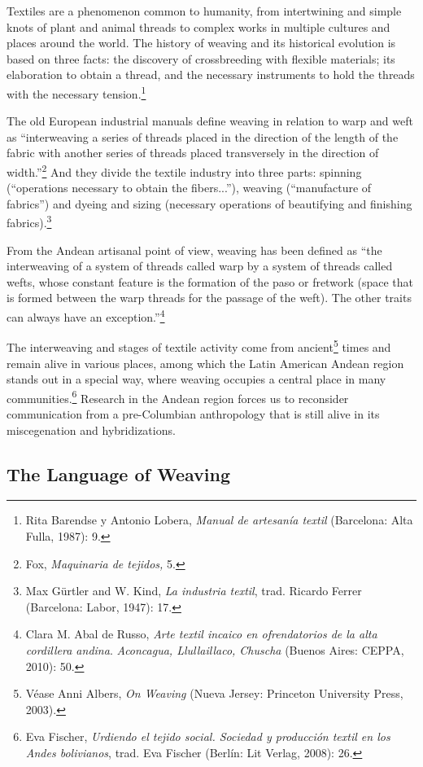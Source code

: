 \documentclass{tufte-handout}
\begin{document}
Textiles are a phenomenon common to humanity, from intertwining and
simple knots of plant and animal threads to complex works in multiple
cultures and places around the world. The history of weaving and its
historical evolution is based on three facts: the discovery of
crossbreeding with flexible materials; its elaboration to obtain a
thread, and the necessary instruments to hold the threads with the
necessary tension.\footnote{Rita Barendse y Antonio Lobera, \emph{Manual
  de artesanía textil} (Barcelona: Alta Fulla, 1987): 9.}

The old European industrial manuals define weaving in relation to warp
and weft as ``interweaving a series of threads placed in the direction
of the length of the fabric with another series of threads placed
transversely in the direction of width.''\footnote{Fox, \emph{Maquinaria
  de tejidos,} 5.} And they divide the textile industry into three
parts: spinning (``operations necessary to obtain the fibers...''),
weaving (``manufacture of fabrics'') and dyeing and sizing (necessary
operations of beautifying and finishing fabrics).\footnote{Max Gürtler
  and W. Kind, \emph{La industria textil}, trad. Ricardo Ferrer
  (Barcelona: Labor, 1947): 17.}

From the Andean artisanal point of view, weaving has been defined as
``the interweaving of a system of threads called warp by a system of
threads called wefts, whose constant feature is the formation of the
paso or fretwork (space that is formed between the warp threads for the
passage of the weft). The other traits can always have an
exception.''\footnote{Clara M. Abal de Russo, \emph{Arte textil incaico
  en ofrendatorios de la alta cordillera andina}. \emph{Aconcagua,
  Llullaillaco, Chuscha} (Buenos Aires: CEPPA, 2010): 50.}

The interweaving and stages of textile activity come from
ancient\footnote{Véase Anni Albers, \emph{On Weaving} (Nueva Jersey:
  Princeton University Press, 2003).} times and remain alive in various
places, among which the Latin American Andean region stands out in a
special way, where weaving occupies a central place in many
communities.\footnote{Eva Fischer, \emph{Urdiendo el tejido social.
  Sociedad y producción textil en los Andes bolivianos}, trad. Eva
  Fischer (Berlín: Lit Verlag, 2008): 26.} Research in the Andean region
forces us to reconsider communication from a pre-Columbian anthropology
that is still alive in its miscegenation and hybridizations.

\hypertarget{the-language-of-weaving}{%
\subsection{The Language of
Weaving}\label{the-language-of-weaving}}
\end{document}
